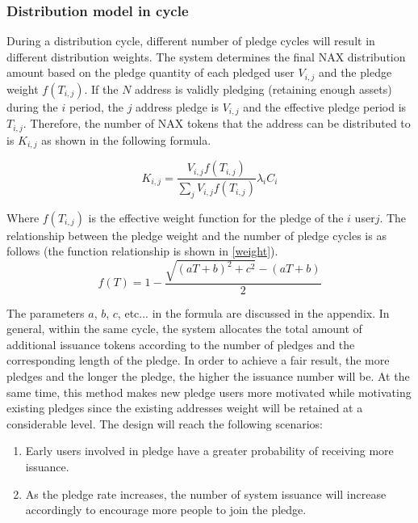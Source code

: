\subsubsection{Distribution model in cycle}
During a distribution cycle, different number of pledge cycles will result in different distribution weights. The system determines the final NAX distribution amount based on the pledge quantity of each pledged user $V_{i, j}$ and the pledge weight \(f(T_{i, j})\). If the $N$ address is validly pledging (retaining enough assets) during the $i$ period, the $j$ address pledge is $V_{i,j}$ and the effective pledge period is $T_{i,j}$. Therefore, the number of NAX tokens that the address can be distributed to is $K_{i,j}$ as shown in the following formula.

\begin{equation}
  K_{i,j} = \frac{V_{i,j} f(T_{i,j})}{\sum_j V_{i,j} f(T_{i,j})} \lambda_i C_i
\end{equation}

Where \(f(T_{i,j})\) is the effective weight function for the pledge of the \(i\) user\(j\). The relationship between the pledge weight and the number of pledge cycles is as follows (the function relationship is shown in \ref{weight}).
  \begin{equation}
    f(T) = 1 - \frac{\sqrt{(aT+b)^2+c^2}-(aT+b)}{2}
  \end{equation}

The parameters $a$, $b$, $c$, etc... in the formula are discussed in the appendix. In general, within the same cycle, the system allocates the total amount of additional issuance tokens according to the number of pledges and the corresponding length of the pledge. In order to achieve a fair result, the more pledges and the longer the pledge, the higher the issuance number will be. At the same time, this method makes new pledge users more motivated while motivating existing pledges since the existing addresses weight will be retained at a considerable level. The design will reach the following scenarios:

\begin{enumerate}[\hspace{1cm}(a)]
  \item Early users involved in pledge have a greater probability of receiving more issuance.
  \item As the pledge rate increases, the number of system issuance will increase accordingly to encourage more people to join the pledge.
\end{enumerate}

